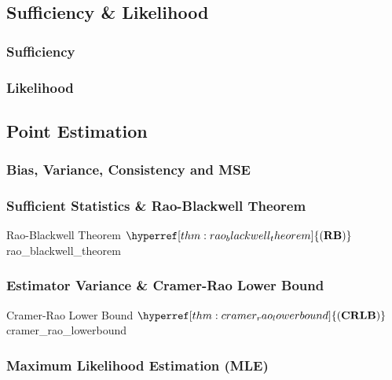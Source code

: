 \subsection{Sufficiency \& Likelihood}
\subsubsection{Sufficiency}
\begin{definition}
    
\end{definition}

\subsubsection{Likelihood}


\subsection{Point Estimation}
\newcommand{\RB}{\hyperref[thm:rao_blackwell_theorem]{(\mathrm{{\bf RB}})}}
\newcommand{\CRLB}{\hyperref[thm:cramer_rao_lowerbound]{(\mathrm{{\bf CRLB}})}}

\subsubsection{Bias, Variance, Consistency and MSE}

\subsubsection{Sufficient Statistics \& Rao-Blackwell Theorem}
\begin{theorem}{Rao-Blackwell Theorem $\RB$}{rao_blackwell_theorem}
    
\end{theorem}


\subsubsection{Estimator Variance \& Cramer-Rao Lower Bound}
\begin{theorem}{Cramer-Rao Lower Bound $\CRLB$}{cramer_rao_lowerbound}

\end{theorem}


\subsubsection{Maximum Likelihood Estimation (MLE)}

